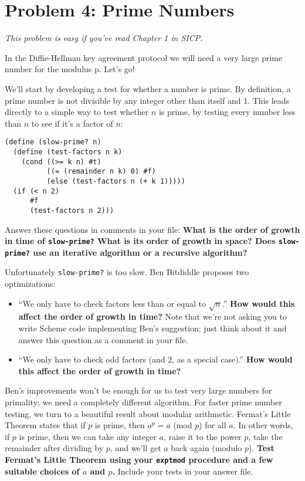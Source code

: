 \newpage

\section*{Problem 4: Prime Numbers}

{\it This problem is easy if you've read Chapter 1 in SICP.}
 
In the Diffie-Hellman key agreement protocol we will need a very
large prime number for the modulus p.  Let's go!

We'll start by developing a test for whether a number is prime.  By
definition, a prime number is not divisible by any integer other than
itself and 1.  This leads directly to a simple way to test whether $n$
is prime, by testing every number less than $n$ to see if it's a
factor of $n$:

\begin{verbatim}
(define (slow-prime? n)
  (define (test-factors n k)
    (cond ((>= k n) #t)
          ((= (remainder n k) 0) #f)
          (else (test-factors n (+ k 1)))))
  (if (< n 2)
      #f
      (test-factors n 2)))
\end{verbatim}

Answer these questions in comments in your file: {\bf What is the
  order of growth in time of {\tt slow-prime?}  What is its order of
  growth in space?  Does {\tt slow-prime?} use an iterative algorithm
  or a recursive algorithm?}

Unfortunately {\tt slow-prime?} is too slow.  Ben Bitdiddle
proposes two optimizations:
\begin{itemize}
\item ``We only have to check factors less than or equal to $\sqrt{n}$.'' 
   {\bf How would this affect the order of growth in time?}  
   Note that we're not asking you to write Scheme code
   implementing Ben's suggestion; just think about it and answer this
   question as a comment in your file.
\item ``We only have to check odd factors (and 2, as a special case).''  
   {\bf How would this affect the order of growth in time?}
\end{itemize}

Ben's improvements won't be enough for us to test very large numbers
for primality; we need a completely different algorithm.  For faster
prime number testing, we turn to a beautiful result about modular
arithmetic.  Fermat's Little Theorem states that if $p$ is prime, then
$a^p = a$ (mod $p$) for all $a$.  In other words, if $p$ is prime,
then we can take any integer $a$, raise it to the power $p$, take the
remainder after dividing by $p$, and we'll get $a$ back again (modulo
$p$).  
{\bf Test Fermat's Little Theorem using your {\tt exptmod}
     procedure and a few suitable choices of $a$ and $p$.}
  Include your tests in your answer file.

